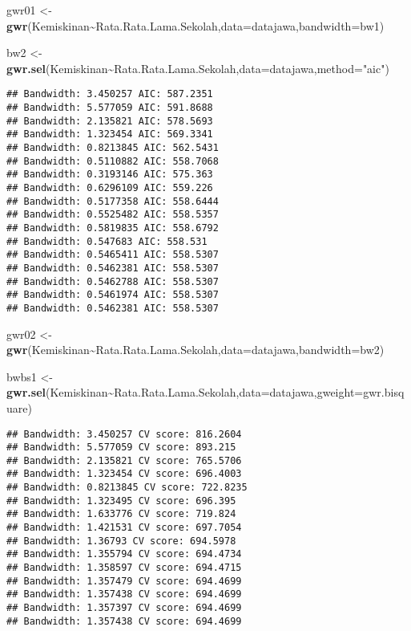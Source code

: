 \documentclass[
]{book}
\newenvironment{Shaded}{\begin{snugshade}}{\end{snugshade}}
\newcommand{\DataTypeTok}[1]{\textcolor[rgb]{0.13,0.29,0.53}{#1}}
\newcommand{\KeywordTok}[1]{\textcolor[rgb]{0.13,0.29,0.53}{\textbf{#1}}}
\newcommand{\NormalTok}[1]{#1}
\newcommand{\OperatorTok}[1]{\textcolor[rgb]{0.81,0.36,0.00}{\textbf{#1}}}
\newcommand{\StringTok}[1]{\textcolor[rgb]{0.31,0.60,0.02}{#1}}
\begin{document}
\begin{Shaded}
\begin{Highlighting}[]
\NormalTok{gwr01 \textless{}{-}}\StringTok{ }\KeywordTok{gwr}\NormalTok{(Kemiskinan}\OperatorTok{\textasciitilde{}}\NormalTok{Rata.Rata.Lama.Sekolah,}\DataTypeTok{data=}\NormalTok{datajawa,}\DataTypeTok{bandwidth=}\NormalTok{bw1)}

\NormalTok{bw2 \textless{}{-}}\StringTok{ }\KeywordTok{gwr.sel}\NormalTok{(Kemiskinan}\OperatorTok{\textasciitilde{}}\NormalTok{Rata.Rata.Lama.Sekolah,}\DataTypeTok{data=}\NormalTok{datajawa,}\DataTypeTok{method=}\StringTok{"aic"}\NormalTok{)}
\end{Highlighting}
\end{Shaded}

\begin{verbatim}
## Bandwidth: 3.450257 AIC: 587.2351 
## Bandwidth: 5.577059 AIC: 591.8688 
## Bandwidth: 2.135821 AIC: 578.5693 
## Bandwidth: 1.323454 AIC: 569.3341 
## Bandwidth: 0.8213845 AIC: 562.5431 
## Bandwidth: 0.5110882 AIC: 558.7068 
## Bandwidth: 0.3193146 AIC: 575.363 
## Bandwidth: 0.6296109 AIC: 559.226 
## Bandwidth: 0.5177358 AIC: 558.6444 
## Bandwidth: 0.5525482 AIC: 558.5357 
## Bandwidth: 0.5819835 AIC: 558.6792 
## Bandwidth: 0.547683 AIC: 558.531 
## Bandwidth: 0.5465411 AIC: 558.5307 
## Bandwidth: 0.5462381 AIC: 558.5307 
## Bandwidth: 0.5462788 AIC: 558.5307 
## Bandwidth: 0.5461974 AIC: 558.5307 
## Bandwidth: 0.5462381 AIC: 558.5307
\end{verbatim}

\begin{Shaded}
\begin{Highlighting}[]
\NormalTok{gwr02 \textless{}{-}}\StringTok{ }\KeywordTok{gwr}\NormalTok{(Kemiskinan}\OperatorTok{\textasciitilde{}}\NormalTok{Rata.Rata.Lama.Sekolah,}\DataTypeTok{data=}\NormalTok{datajawa,}\DataTypeTok{bandwidth=}\NormalTok{bw2)}

\NormalTok{bwbs1 \textless{}{-}}\StringTok{ }\KeywordTok{gwr.sel}\NormalTok{(Kemiskinan}\OperatorTok{\textasciitilde{}}\NormalTok{Rata.Rata.Lama.Sekolah,}\DataTypeTok{data=}\NormalTok{datajawa,}\DataTypeTok{gweight=}\NormalTok{gwr.bisquare)}
\end{Highlighting}
\end{Shaded}

\begin{verbatim}
## Bandwidth: 3.450257 CV score: 816.2604 
## Bandwidth: 5.577059 CV score: 893.215 
## Bandwidth: 2.135821 CV score: 765.5706 
## Bandwidth: 1.323454 CV score: 696.4003 
## Bandwidth: 0.8213845 CV score: 722.8235 
## Bandwidth: 1.323495 CV score: 696.395 
## Bandwidth: 1.633776 CV score: 719.824 
## Bandwidth: 1.421531 CV score: 697.7054 
## Bandwidth: 1.36793 CV score: 694.5978 
## Bandwidth: 1.355794 CV score: 694.4734 
## Bandwidth: 1.358597 CV score: 694.4715 
## Bandwidth: 1.357479 CV score: 694.4699 
## Bandwidth: 1.357438 CV score: 694.4699 
## Bandwidth: 1.357397 CV score: 694.4699 
## Bandwidth: 1.357438 CV score: 694.4699
\end{verbatim}
\end{document}

